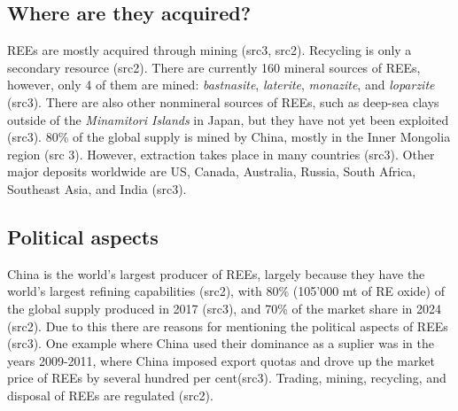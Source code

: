 \subsection{Where are they acquired?}

REEs are mostly acquired through mining (src3, src2). Recycling is only a secondary resource (src2). There are currently 160 mineral sources of REEs, however, only 4 of them are mined: \textit{bastnasite}, \textit{laterite}, \textit{monazite}, and \textit{loparzite} (src3). There are also other nonmineral sources of REEs, such as deep-sea clays outside of the \textit{Minamitori Islands} in Japan, but they have not yet been exploited (src3). 80\% of the global supply is mined by China, mostly in the Inner Mongolia region (src 3). However, extraction takes place in many countries (src3). Other major deposits worldwide are US, Canada, Australia, Russia, South Africa, Southeast Asia, and India (src3).

\subsection{Political aspects}

China is the world's largest producer of REEs, largely because they have the world's largest refining capabilities (src2), with 80\% (105'000 mt of RE oxide) of the global supply produced in 2017 (src3), and 70\% of the market share in 2024 (src2). Due to this there are reasons for mentioning the political aspects of REEs (src3). One example where China used their dominance as a suplier was in the years 2009-2011, where China imposed export quotas and drove up the market price of REEs by several hundred per cent(src3). Trading, mining, recycling, and disposal of REEs are regulated (src2).